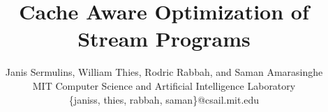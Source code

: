 \documentclass{sig-alternate}
\title{Cache Aware Optimization of Stream Programs}
\author{
	Janis Sermulins, William Thies, Rodric Rabbah, and Saman Amarasinghe\\
	\small MIT Computer Science and Artificial Intelligence Laboratory\\
	\small \{janiss, thies, rabbah, saman\}@csail.mit.edu
}
\begin{document}
\maketitle

\begin{abstract}

\end{abstract}










{\tiny
  
  
}
\end{document}
